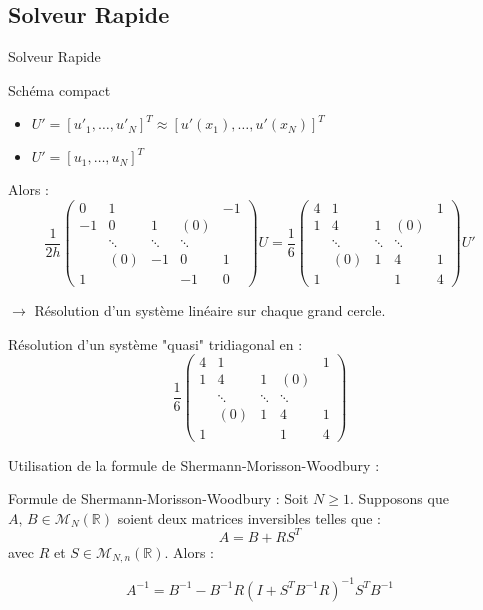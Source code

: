 \documentclass[11pt]{beamer}
\begin{document}

\subsection{Solveur Rapide}
\begin{frame}{Solveur Rapide}
\begin{block}{Schéma compact}
\begin{itemize}
\item $U' = \left[ u'_1, \hdots ,u'_N \right]^T \approx \left[ u'(x_1), \hdots ,u'(x_N) \right]^T$

\item $U' = \left[ u_1, \hdots ,u_N \right]^T$
\end{itemize}

\pause

Alors :
$$\dfrac{1}{2h}\begin{pmatrix}
0 & 1 &   &   & -1 \\ 
-1 & 0 & 1 & (0) &   \\ 
  & \ddots & \ddots & \ddots &   \\ 
  & (0) & -1 & 0 & 1 \\ 
1 &   &   & -1 & 0
\end{pmatrix} U = \dfrac{1}{6} \begin{pmatrix}
4 & 1 &   &   & 1 \\ 
1 & 4 & 1 & (0) &   \\ 
  & \ddots & \ddots & \ddots &   \\ 
  & (0) & 1 & 4 & 1 \\ 
1 &   &   & 1 & 4
\end{pmatrix} U'$$
\end{block}
\pause
$\rightarrow$ Résolution d'un système linéaire sur chaque grand cercle.
\end{frame}

\begin{frame}
Résolution d'un système "quasi" tridiagonal en : 
$$\dfrac{1}{6} \begin{pmatrix}
4 & 1 &   &   & 1 \\ 
1 & 4 & 1 & (0) &   \\ 
  & \ddots & \ddots & \ddots &   \\ 
  & (0) & 1 & 4 & 1 \\ 
1 &   &   & 1 & 4
\end{pmatrix}$$

Utilisation de la formule de Shermann-Morisson-Woodbury :

\begin{block}{Formule de Shermann-Morisson-Woodbury :}
Soit $N \geq 1$. Supposons que $A\text{, }B \in \mathcal{M}_N \left( \mathbb{R} \right)$ soient deux matrices inversibles telles que :
$$A = B + RS^T$$
avec $R$ et $S \in \mathcal{M}_{N,n} \left( \mathbb{R} \right)$. Alors :

$$A^{-1} = B^{-1} - B^{-1}R\left( I + S^T B^{-1} R\right)^{-1} S^T B^{-1}$$
\end{block}
\end{frame}
\end{document}
